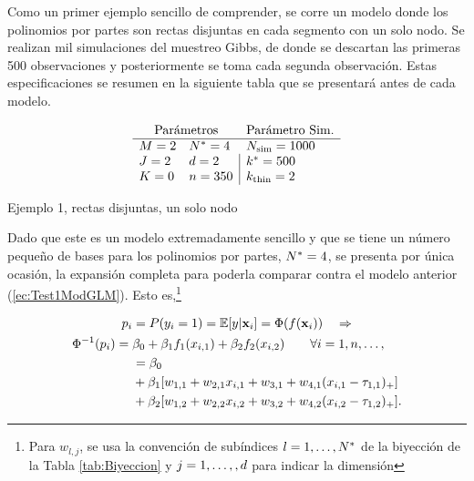\documentclass[../Main/Main.tex]{subfiles}
\begin{document}
Como un primer ejemplo sencillo de comprender, se corre un modelo donde los polinomios por partes son rectas disjuntas en cada segmento con un solo nodo. Se realizan mil simulaciones del muestreo Gibbs, de donde se descartan las primeras 500 observaciones y posteriormente se toma cada segunda observación. Estas especificaciones se resumen en la siguiente tabla que se presentará antes de cada modelo. 
\begin{table}[H]
$$\paramsmod{2}{2}{0}{4}{2}{350}{1000}{500}{2}$$
\caption{Ejemplo 1, rectas disjuntas, un solo nodo}
\label{ej:1}
\end{table}

Dado que este es un modelo extremadamente sencillo y que se tiene un número pequeño de bases para los polinomios por partes, $N^* = 4$, se presenta por única ocasión, la expansión completa para poderla comparar contra el modelo anterior (\ref{ec:Test1ModGLM}). Esto es,\footnote{Para $w_{l,j}$, se usa la convención de subíndices $l = 1,\ldots,N^*$ de la biyección de la Tabla \ref{tab:Biyeccion} y $j = 1,\ldots,,{d}$ para indicar la dimensión}

\begin{align}
	p_i &= P(y_i = 1) =\mathbb{E}[y|\mathbf{x}_i] = \Phi(f(\mathbf{x}_i))  \quad \Rightarrow  			\nonumber \\
	\Phi^{-1}(p_i) = \;&\beta_0 + \beta_1f_1(x_{i,1}) + \beta_2f_2(x_{i,2}) 
	\qquad 	\forall i = 1,n,\ldots,\label{ec:Test1Ej1} \\
	&= \beta_0 \nonumber \\
	&+ \beta_1[w_{1,1} + w_{2,1}x_{i,1} + w_{3,1} + w_{4,1}(x_{i,1} - \tau_{1,1})_+] \label{ec:Test1Ej1F1}\\
	& +\beta_2[w_{1,2} + w_{2,2}x_{i,2} + w_{3,2} + w_{4,2}(x_{i,2} - \tau_{1,2})_+]. \label{ec:Test1Ej1F2}
\end{align}
\end{document}
